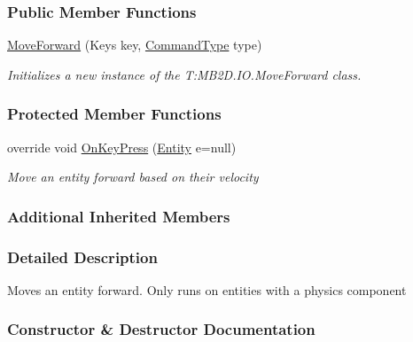 \subsubsection*{Public Member Functions}
\begin{DoxyCompactItemize}
\item 
\hyperlink{class_m_b2_d_1_1_i_o_1_1_move_forward_a2f87f71aa920e4b6ac2aa4924a04ce27}{Move\+Forward} (Keys key, \hyperlink{namespace_m_b2_d_1_1_i_o_ab5f95f3fe9e652778b62bdf943168a68}{Command\+Type} type)
\begin{DoxyCompactList}\small\item\em Initializes a new instance of the T\+:\+M\+B2\+D.\+I\+O.\+Move\+Forward class. \end{DoxyCompactList}\end{DoxyCompactItemize}
\subsubsection*{Protected Member Functions}
\begin{DoxyCompactItemize}
\item 
override void \hyperlink{class_m_b2_d_1_1_i_o_1_1_move_forward_a32d5bfbf101ab8ff8150f2f07f0b5ac8}{On\+Key\+Press} (\hyperlink{class_m_b2_d_1_1_entity_component_1_1_entity}{Entity} e=null)
\begin{DoxyCompactList}\small\item\em Move an entity forward based on their velocity \end{DoxyCompactList}\end{DoxyCompactItemize}
\subsubsection*{Additional Inherited Members}


\subsubsection{Detailed Description}
Moves an entity forward. Only runs on entities with a physics component 



\subsubsection{Constructor \& Destructor Documentation}
\hypertarget{class_m_b2_d_1_1_i_o_1_1_move_forward_a2f87f71aa920e4b6ac2aa4924a04ce27}{}\label{class_m_b2_d_1_1_i_o_1_1_move_forward_a2f87f71aa920e4b6ac2aa4924a04ce27} 
